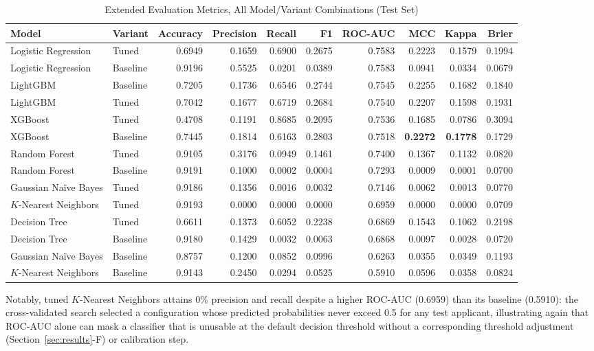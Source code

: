\documentclass[journal]{IEEEtran}
\begin{document}
\begin{table}[!t]
\caption{Extended Evaluation Metrics, All Model/Variant Combinations (Test Set)}
\label{tab:extendedmetrics}
\centering
\begin{tabular}{llrrrrrrrr}
\toprule
Model & Variant & Accuracy & Precision & Recall & F1 & ROC-AUC & MCC & Kappa & Brier \\
\midrule
Logistic Regression & Tuned & 0.6949 & 0.1659 & 0.6900 & 0.2675 & 0.7583 & 0.2223 & 0.1579 & 0.1994 \\
Logistic Regression & Baseline & 0.9196 & 0.5525 & 0.0201 & 0.0389 & 0.7583 & 0.0941 & 0.0334 & 0.0679 \\
LightGBM & Baseline & 0.7205 & 0.1736 & 0.6546 & 0.2744 & 0.7545 & 0.2255 & 0.1682 & 0.1840 \\
LightGBM & Tuned & 0.7042 & 0.1677 & 0.6719 & 0.2684 & 0.7540 & 0.2207 & 0.1598 & 0.1931 \\
XGBoost & Tuned & 0.4708 & 0.1191 & 0.8685 & 0.2095 & 0.7536 & 0.1685 & 0.0786 & 0.3094 \\
XGBoost & Baseline & 0.7445 & 0.1814 & 0.6163 & 0.2803 & 0.7518 & \textbf{0.2272} & \textbf{0.1778} & 0.1729 \\
Random Forest & Tuned & 0.9105 & 0.3176 & 0.0949 & 0.1461 & 0.7400 & 0.1367 & 0.1132 & 0.0820 \\
Random Forest & Baseline & 0.9191 & 0.1000 & 0.0002 & 0.0004 & 0.7293 & 0.0009 & 0.0001 & 0.0700 \\
Gaussian Naïve Bayes & Tuned & 0.9186 & 0.1356 & 0.0016 & 0.0032 & 0.7146 & 0.0062 & 0.0013 & 0.0770 \\
$K$-Nearest Neighbors & Tuned & 0.9193 & 0.0000 & 0.0000 & 0.0000 & 0.6959 & 0.0000 & 0.0000 & 0.0709 \\
Decision Tree & Tuned & 0.6611 & 0.1373 & 0.6052 & 0.2238 & 0.6869 & 0.1543 & 0.1062 & 0.2198 \\
Decision Tree & Baseline & 0.9180 & 0.1429 & 0.0032 & 0.0063 & 0.6868 & 0.0097 & 0.0028 & 0.0720 \\
Gaussian Naïve Bayes & Baseline & 0.8757 & 0.1200 & 0.0852 & 0.0996 & 0.6263 & 0.0355 & 0.0349 & 0.1193 \\
$K$-Nearest Neighbors & Baseline & 0.9143 & 0.2450 & 0.0294 & 0.0525 & 0.5910 & 0.0596 & 0.0358 & 0.0824 \\
\bottomrule
\end{tabular}
\end{table}

Notably, tuned $K$-Nearest Neighbors attains 0\% precision and recall despite a higher ROC-AUC (0.6959) than its baseline (0.5910): the cross-validated search selected a configuration whose predicted probabilities never exceed 0.5 for any test applicant, illustrating again that ROC-AUC alone can mask a classifier that is unusable at the default decision threshold without a corresponding threshold adjustment (Section~\ref{sec:results}-F) or calibration step.
\end{document}
